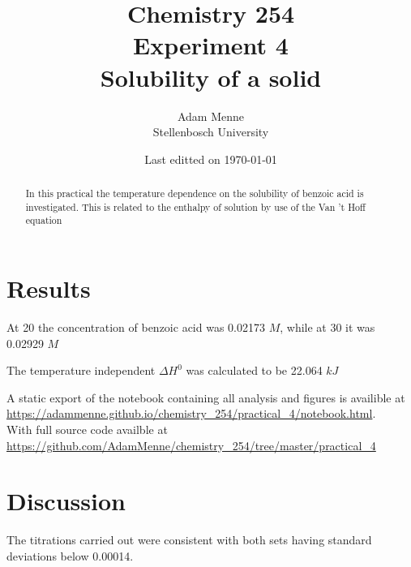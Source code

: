 \documentclass[a4paper, british]{article}
\title{Chemistry 254\\ Experiment 4\\ Solubility of a solid}
\date{Last editted on \today}
\author{Adam Menne\\ Stellenbosch University}
\begin{document}
\maketitle

\begin{abstract}
\noindent
In this practical the temperature dependence on the solubility of benzoic acid is investigated. This is related to the enthalpy of solution by use of the Van 't Hoff equation
\end{abstract}

\tableofcontents

\newpage


\section{Results}

At 20 \textcelsius{} the concentration of benzoic acid was 0.02173 \(M\), while at 30 \textcelsius{} it was 0.02929 \(M\)

The temperature independent \(\Delta H^0\) was calculated to be 22.064 \(kJ\)

A static export of the notebook containing all analysis and figures is availible at \url{https://adammenne.github.io/chemistry_254/practical_4/notebook.html}.\\ With full source code availble at \url{https://github.com/AdamMenne/chemistry_254/tree/master/practical_4}

\section{Discussion}

The titrations carried out were consistent with both sets having standard deviations below 0.00014.

\newpage
\end{document}

